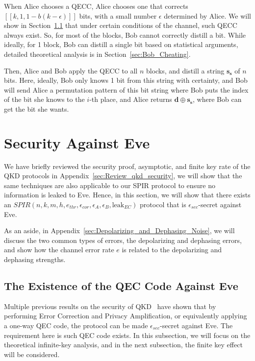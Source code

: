 \documentclass[%
 reprint,
superscriptaddress,
 amsmath,amssymb,
 aps,
]{revtex4-2}
\begin{document}
When Alice chooses a QECC, Alice chooses one that corrects $[[k, 1, 1-b(k-\epsilon)]]$ bits, with a small number $\epsilon$ determined by Alice. We will show in Section~\ref{sec:QECC_existence} that under certain conditions of the channel, such QECC always exist. So, for most of the blocks, Bob cannot correctly distill a bit. While ideally, for 1 block, Bob can distill a single bit based on statistical arguments, detailed theoretical analysis is in Section~\ref{sec:Bob_Cheating}.

Then, Alice and Bob apply the QECC to all $n$ blocks, and distill a string $\mathbf{s_s}$ of $n$ bits. Here, ideally, Bob only knows 1 bit from this string with certainty, and Bob will send Alice a permutation pattern of this bit string where Bob puts the index of the bit she knows to the $i$-th place, and Alice returns $\mathbf{d}\oplus \mathbf{s_s}$, where Bob can get the bit she wants.

\section{Security Against Eve}

We have briefly reviewed the security proof, asymptotic, and finite key rate of the QKD protocols in Appendix~\ref{sec:Review_qkd_security}, we will show that the same techniques are also applicable to our SPIR protocol to ensure no information is leaked to Eve. Hence, in this section, we will show that there exists an $SPIR(n, k, m, h, e_{thr}, \epsilon_{cor}, \epsilon_{A}, \epsilon_{B}, \text{leak}_{EC})$ protocol that is $\epsilon_{sec}$-secret against Eve.

As an aside, in Appendix~\ref{sec:Depolarizing_and_Dephasing_Noise}, we will discuss the two common types of errors, the depolarizing and dephasing errors, and show how the channel error rate $e$ is related to the depolarizing and dephasing strengths.

\subsection{The Existence of the QEC Code Against Eve}
\label{sec:QECC_existence}
Multiple previous results on the security of QKD~\cite{Shor_Preskill_Proof1} have shown that by performing Error Correction and Privacy Amplification, or equivalently applying a one-way QEC code, the protocol can be made $\epsilon_{sec}$-secret against Eve. The requirement here is such QEC code exists. In this subsection, we will focus on the theoretical infinite-key analysis, and in the next subsection, the finite key effect will be considered.
\end{document}
